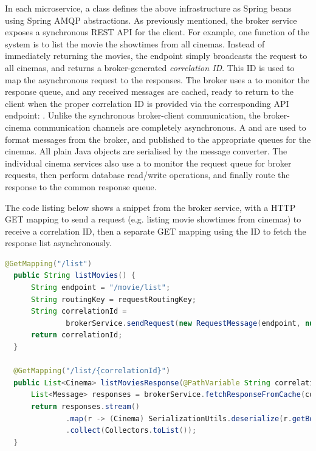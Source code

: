 In each microservice, a   class defines the above infrastructure as Spring beans using Spring AMQP abstractions. As previously mentioned, the broker service exposes a synchronous REST API for the client. For example, one function of the system is to list the movie the showtimes from all cinemas. Instead of immediately returning the movies, the  endpoint simply broadcasts the request to all cinemas, and returns a broker-generated \textit{correlation ID}. This ID is used to map the asynchronous request to the responses. The broker uses a  to monitor the response queue, and any received messages are cached, ready to return to the client when the proper correlation ID is provided via the corresponding API endpoint: . Unlike the synchronous broker-client communication, the broker-cinema communication channels are completely asynchronous. A  and  are used to format messages from the broker, and published to the appropriate queues for the cinemas. All plain Java objects are serialised by the message converter. The individual cinema services also use a  to monitor the request queue for broker requests, then perform database read/write operations, and finally route the response to the common response queue.

The code listing below shows a snippet from the broker service, with a HTTP GET mapping to send a request (e.g. listing movie showtimes from cinemas) to receive a correlation ID, then a separate GET mapping using the ID to fetch the response list asynchronously.


\begin{lstlisting}[language=Java, caption=Code snippet from \code{MovieController.java} in \code{broker-service}]
  @GetMapping("/list")
  public String listMovies() {
      String endpoint = "/movie/list";
      String routingKey = requestRoutingKey;
      String correlationId =
              brokerService.sendRequest(new RequestMessage(endpoint, null), routingKey);
      return correlationId;
  }

  @GetMapping("/list/{correlationId}")
  public List<Cinema> listMoviesResponse(@PathVariable String correlationId) {
      List<Message> responses = brokerService.fetchResponseFromCache(correlationId);
      return responses.stream()
              .map(r -> (Cinema) SerializationUtils.deserialize(r.getBody()))
              .collect(Collectors.toList());
  }
\end{lstlisting}


